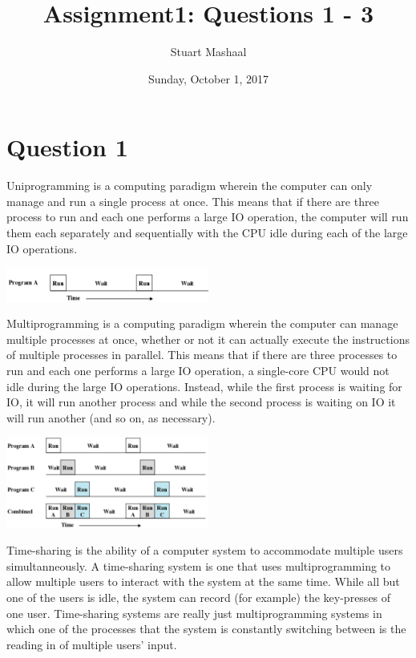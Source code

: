 \documentclass[11pt, letterpaper]{article}
\title{Assignment1: Questions 1 - 3}
\author{Stuart Mashaal}
\date{Sunday, October 1, 2017}
\begin{document}
\maketitle

\section*{Question 1}

Uniprogramming is a computing paradigm wherein the computer can only manage and run a single process at once.  This means that if there are three process to run and each one performs a large IO operation, the computer will run them each separately and sequentially with the CPU idle during each of the large IO operations.

\begin{center}
    \includegraphics[width=0.5\textwidth]{uniprogramming.png}
\end{center}

Multiprogramming is a computing paradigm wherein the computer can manage multiple processes at once, whether or not it can actually execute the instructions of multiple processes in parallel.  This means that if there are three processes to run and each one performs a large IO operation, a single-core CPU would not idle during the large IO operations.  Instead, while the first process is waiting for IO, it will run another process and while the second process is waiting on IO it will run another (and so on, as necessary).

\begin{center}
    \includegraphics[width=0.5\textwidth]{multiprogramming.png}
\end{center}

Time-sharing is the ability of a computer system to accommodate multiple users simultanneously.  A time-sharing system is one that uses multiprogramming to allow multiple users to interact with the system at the same time.  While all but one of the users is idle, the system can record (for example) the key-presses of one user.  Time-sharing systems are really just multiprogramming systems in which one of the processes that the system is constantly switching between is the reading in of multiple users' input.
\end{document}

